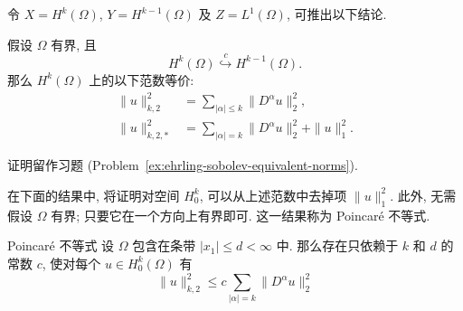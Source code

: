 令 $X=H^k(\Omega)$, $Y=H^{k-1}(\Omega)$ 及 $Z=L^1(\Omega)$, 可推出以下结论.

\begin{Corollary}
\label{cor:ehrling-sobolev-equivalent-norms}
假设 $\Omega$ 有界, 且\[H^k(\Omega)\overset{c}{\hookrightarrow}H^{k-1}(\Omega).\]那么 $H^k(\Omega)$ 上的以下范数等价:
\begin{equation}\label{eq:sobolev-ehrling-equivalent-norms}
\begin{aligned}
\|u\|_{k,2}^2&=\sum_{|\alpha|\leq k}\|D^\alpha u\|_2^2,\\
\|u\|_{k,2,*}^2&=\sum_{|\alpha|=k}\|D^\alpha u\|_2^2+\|u\|_1^2.
\end{aligned}
\end{equation}

\end{Corollary}

证明留作习题 (Problem~\ref{ex:ehrling-sobolev-equivalent-norms}).

在下面的结果中, 将证明对空间 $H_0^k$, 可以从上述范数中去掉项 $\|u\|_1^2$. 此外, 无需假设 $\Omega$ 有界; 只要它在一个方向上有界即可. 这一结果称为 Poincaré 不等式.

\begin{Theorem}{Poincaré 不等式}
\label{thm:poincare-zero-boundary-highest-derivatives}
设 $\Omega$ 包含在条带 $|x_1|\leq d<\infty$ 中. 那么存在只依赖于 $k$ 和 $d$ 的常数 $c$, 使对每个 $u\in H_0^k(\Omega)$ 有
\begin{equation}\label{eq:poincare-zero-boundary-highest-derivative-control}
\|u\|_{k,2}^2\leq c\sum_{|\alpha|=k}\|D^\alpha u\|_2^2
\end{equation}

\end{Theorem}

\begingroup
{}
\renewcommand{\endProof}{\par\nobreak\hfill$\blacksquare$\par\vspace{0.1cm}}
\endgroup

